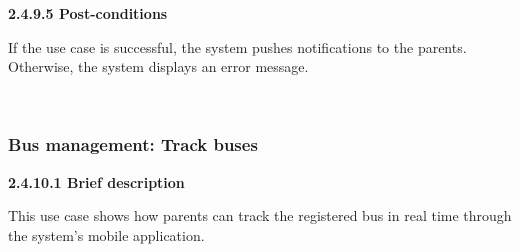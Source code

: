 \indent\textbf{2.4.9.5 Post-conditions}\\
\vspace{-0.7em}
\par\indent\indent\parbox{0.9\textwidth}{
    If the use case is successful, the system pushes notifications to the parents. Otherwise, the system displays an error message.
}\\

\subsubsection{Bus management: Track buses}
\indent\indent\textbf{2.4.10.1 Brief description}
\vspace{0.5em}
\par\indent\indent\parbox{0.9\textwidth}{
    This use case shows how parents can track the registered bus in real time through the system's mobile application.
}\\

